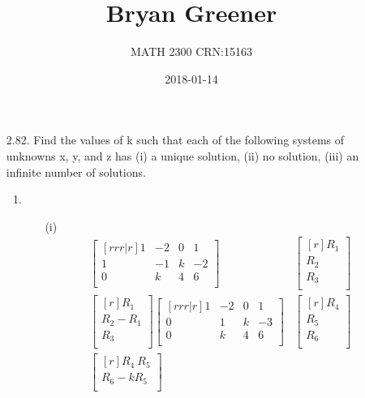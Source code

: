 \documentclass[12pt]{article}
\title{Bryan Greener}
\author{MATH 2300 CRN:15163}
\date{2018-01-14}
\begin{document}
\maketitle

\TabPositions{4cm}

\begin{enumerate}
\item [2.82.] Find the values of k such that each of the following systems of unknowns x, y, and z has (i) a unique solution, (ii) no solution, (iii) an infinite number of solutions.
	\begin{enumerate}
	\item
	\medskip
		\begin{enumerate}
		\item [(i)]
		\begin{align*}
		\begin{bmatrix}[rrr|r]
		1 & -2 & 0 & 1\\
		1 & -1 & k & -2\\
		0 & k & 4 & 6\\
		\end{bmatrix}&
		\begin{bmatrix}[r]
		R_1\\ R_2\\ R_3\\
		\end{bmatrix}\\
		\begin{bmatrix}[r]
		R_1\\
		R_2 - R_1\\
		R_3\\
		\end{bmatrix}
		\begin{bmatrix}[rrr|r]
		1 & -2 & 0 & 1\\
		0 & 1 & k & -3\\
		0 & k & 4 & 6\\
		\end{bmatrix}&
		\begin{bmatrix}[r]
		R_{4}\\ R_{5}\\ R_{6}\\
		\end{bmatrix}\\
		\begin{bmatrix}[r]
		R_4\
		R_5\\
		R_6 - kR_5\\

\end{bmatrix}
\end{align*}
\end{enumerate}
\end{enumerate}
\end{enumerate}
\end{document}
